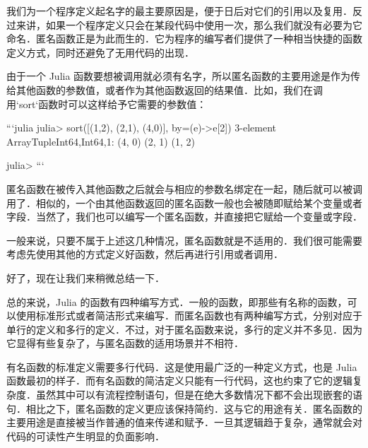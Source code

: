 我们为一个程序定义起名字的最主要原因是，便于日后对它们的引用以及复用．反过来讲，如果一个程序定义只会在某段代码中使用一次，那么我们就没有必要为它命名．匿名函数正是为此而生的．它为程序的编写者们提供了一种相当快捷的函数定义方式，同时还避免了无用代码的出现．

由于一个 Julia 函数要想被调用就必须有名字，所以匿名函数的主要用途是作为传给其他函数的参数值，或者作为其他函数返回的结果值．比如，我们在调用`sort`函数时可以这样给予它需要的参数值：

```julia
julia> sort([(1,2), (2,1), (4,0)], by=(e)->e[2])
3-element Array{Tuple{Int64,Int64},1}:
 (4, 0)
 (2, 1)
 (1, 2)

julia> 
```

匿名函数在被传入其他函数之后就会与相应的参数名绑定在一起，随后就可以被调用了．相似的，一个由其他函数返回的匿名函数一般也会被随即赋给某个变量或者字段．当然了，我们也可以编写一个匿名函数，并直接把它赋给一个变量或字段．

一般来说，只要不属于上述这几种情况，匿名函数就是不适用的．我们很可能需要考虑先使用其他的方式定义好函数，然后再进行引用或者调用．

好了，现在让我们来稍微总结一下．

总的来说，Julia 的函数有四种编写方式．一般的函数，即那些有名称的函数，可以使用标准形式或者简洁形式来编写．而匿名函数也有两种编写方式，分别对应于单行的定义和多行的定义．不过，对于匿名函数来说，多行的定义并不多见．因为它显得有些复杂了，与匿名函数的适用场景并不相符．

有名函数的标准定义需要多行代码．这是使用最广泛的一种定义方式，也是 Julia 函数最初的样子．而有名函数的简洁定义只能有一行代码，这也约束了它的逻辑复杂度．虽然其中可以有流程控制语句，但是在绝大多数情况下都不会出现嵌套的语句．相比之下，匿名函数的定义更应该保持简约．这与它的用途有关．匿名函数的主要用途是直接被当作普通的值来传递和赋予．一旦其逻辑趋于复杂，通常就会对代码的可读性产生明显的负面影响．